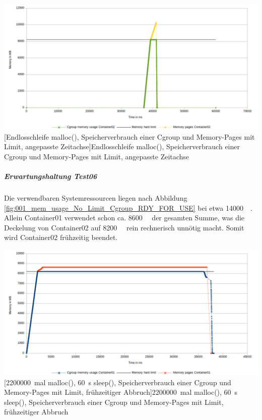 \vspace{1em}
\begin{minipage}{\linewidth}
	\centering
	\includegraphics[width=1\linewidth]{pics/005_mem_usage_8200mb_limit_Container02_Basis_RDY_FOR_USE_FOCUS.png}
	[Endlosschleife malloc(), Speicherverbrauch einer Cgroup und Memory-Pages mit Limit, angepasste Zeitachse]{Endlosschleife malloc(), Speicherverbrauch einer Cgroup und Memory-Pages mit Limit, angepasste Zeitachse}
	\label{fig:005_mem_usage_8200mb_limit_Container02_Basis_RDY_FOR_USE_FOCUS}
\end{minipage}

\subparagraph{Erwartungshaltung Test06}
Die verwendbaren Systemressourcen liegen nach Abbildung \ref{fig:001_mem_usage_No_Limit_Cgroup_RDY_FOR_USE} bei etwa \SI{14000}{\mega\byte}. Allein Container01 verwendet schon ca. \SI{8600}{\mega\byte} der gesamten Summe, was die Deckelung von Container02 auf \SI{8200}{\mega\byte} rein rechnerisch unnötig macht. Somit wird Container02 frühzeitig beendet. 

\vspace{1em}
\begin{minipage}{\linewidth}
	\centering
	\includegraphics[width=1\linewidth]{pics/006_mem_usage_8200mb_limit_Container01_mit_ipact_RDY_FOR_USE.png}
	[\SI{2200000}{mal} malloc(), \SI{60}{\second} sleep(), Speicherverbrauch einer Cgroup und Memory-Pages mit Limit, frühzeitiger Abbruch]{\SI{2200000}{mal} malloc(), \SI{60}{\second} sleep(), Speicherverbrauch einer Cgroup und Memory-Pages mit Limit, frühzeitiger Abbruch}
	\label{fig:006_mem_usage_8200mb_limit_Container01_mit_ipact_RDY_FOR_USE}
\end{minipage}


